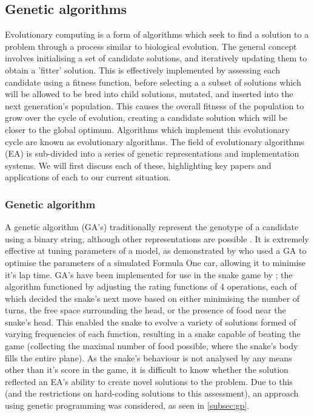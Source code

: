 \documentclass[british,10pt,a4paper]{article}
\begin{document}
\subsection{Genetic algorithms}
Evolutionary computing is a form of algorithms which seek to find a solution to a problem through a process similar to biological evolution. \cite{Ashlock_undated-vx} The general concept involves initialising a set of candidate solutions, and iteratively updating them to obtain a 'fitter' solution. This is effectively implemented by assessing each candidate using a fitness function, before selecting a a subset of solutions which will be allowed to be bred into child solutions, mutated, and inserted into the next generation's population. This causes the overall fitness of the population to grow over the cycle of evolution, creating a candidate solution which will be closer to the global optimum. Algorithms which implement this evolutionary cycle are known as evolutionary algorithms. The field of evolutionary algorithms (EA) is sub-divided into a series of genetic representations and implementation systems. We will first discuss each of these, highlighting key papers and applications of each to our current situation.\newline

\subsubsection{Genetic algorithm}
A genetic algorithm (GA's) traditionally represent the genotype of a candidate using a binary string, although other representations are possible \cite{Whitley1994-tx}. It is extremely effective at tuning parameters of a model, as demonstrated by \citet{Wloch2004-vo} who used a GA to optimise the parameters of a simulated Formula One car, allowing it to minimise it's lap time. GA's have been implemented for use in the snake game by \citet{Yeh2016-ts}; the algorithm functioned by adjusting the rating functions of 4 operations, each of which decided the snake's next move based on either minimising the number of turns, the free space surrounding the head, or the presence of food near the snake's head. This enabled the snake to evolve a variety of solutions formed of varying frequencies of each function, resulting in a snake capable of beating the game (collecting the maximal number of food possible, where the snake's body fills the entire plane). As the snake's behaviour is not analysed by any means other than it's score in the game, it is difficult to know whether the solution reflected an EA's ability to create novel solutions to the problem. Due to this (and the restrictions on hard-coding solutions to this assessment), an approach using genetic programming was considered, as seen in \autoref{subsec:gp}.
\end{document}
